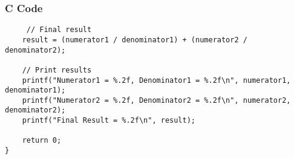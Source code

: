 \documentclass{beamer}
\begin{document}
\begin{frame}[fragile]
    \frametitle{C Code }
    \begin{lstlisting}
     // Final result
    result = (numerator1 / denominator1) + (numerator2 / denominator2);

    // Print results
    printf("Numerator1 = %.2f, Denominator1 = %.2f\n", numerator1, denominator1);
    printf("Numerator2 = %.2f, Denominator2 = %.2f\n", numerator2, denominator2);
    printf("Final Result = %.2f\n", result);

    return 0;
}
    \end{lstlisting}
\end{frame}
\end{document}
